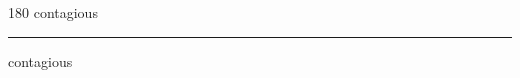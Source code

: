 
\begin{frame}
\begin{center}
\begin{turn}{180}
{\fontsize{2.5cm}{1em}\selectfont contagious}
\end{turn}
\vspace{1em}\par  
\hrule
\vspace{1em}\par  
{\fontsize{2.5cm}{1em}\selectfont contagious}
\end{center}
\end{frame}
